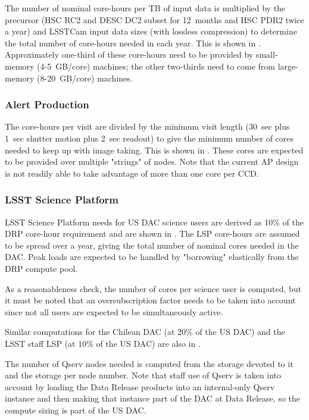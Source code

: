 The number of nominal core-hours per TB of input data is multiplied by the precursor (HSC RC2 and DESC DC2 subset for 12~months and HSC PDR2 twice a year) and LSSTCam input data sizes (with lossless compression) to determine the total number of core-hours needed in each year.
This is shown in .
Approximately one-third of these core-hours need to be provided by small-memory (4-5~GB/core) machines; the other two-thirds need to come from large-memory (8-20~GB/core) machines.



\subsubsection{Alert Production}

The core-hours per visit are divided by the minimum visit length (30~sec plus 1~sec shutter motion plus 2~sec readout) to give the minimum number of cores needed to keep up with image taking.
This is shown in .
These cores are expected to be provided over multiple "strings" of nodes.
Note that the current AP design is not readily able to take advantage of more than one core per CCD.

\subsubsection{LSST Science Platform}

LSST Science Platform needs for US DAC science users are derived as 10\% of the DRP core-hour requirement and are shown in .
The LSP core-hours are assumed to be spread over a year, giving the total number of nominal cores needed in the DAC.
Peak loads are expected to be handled by "borrowing" elastically from the DRP compute pool.

As a reasonableness check, the number of cores per science user is computed, but it must be noted that an oversubscription factor needs to be taken into account since not all users are expected to be simultaneously active.

Similar computations for the Chilean DAC (at 20\% of the US DAC) and the LSST staff LSP (at 10\% of the US DAC) are also in .

The number of Qserv nodes needed is computed from the storage devoted to it and the storage per node number.
Note that staff use of Qserv is taken into account by loading the Data Release products into an internal-only Qserv instance and then making that instance part of the DAC at Data Release, so the compute sizing is part of the US DAC.

